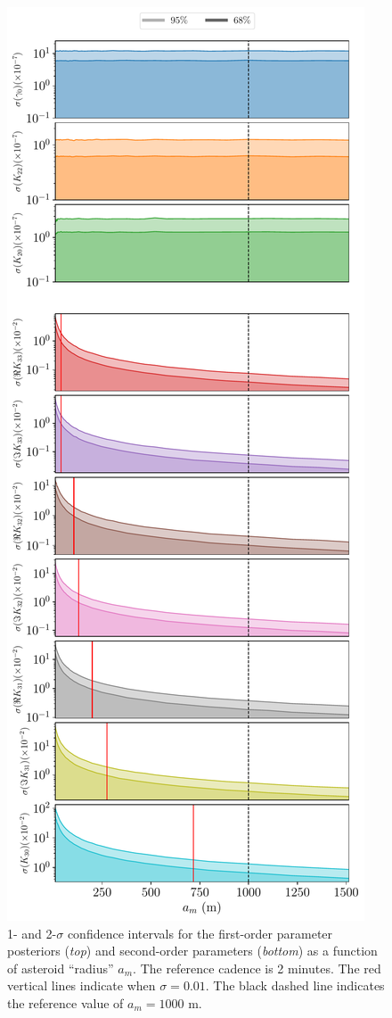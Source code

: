\documentclass[fleqn,usenatbib]{mnras}
\begin{document}
\begin{figure}
  \centering
  \includegraphics[height=0.89\textheight]{figs/scan-am.pdf}
  \caption{1- and 2-$\sigma$ confidence intervals for the first-order parameter posteriors (\textit{top}) and second-order parameters (\textit{bottom}) as a function of asteroid ``radius'' $a_m$. The reference cadence is 2 minutes. The red vertical lines indicate when $\sigma = 0.01$. The black dashed line indicates the reference value of $a_m=1000$ m.}
  \label{fig:scan-am}
\end{figure}
\end{document}
